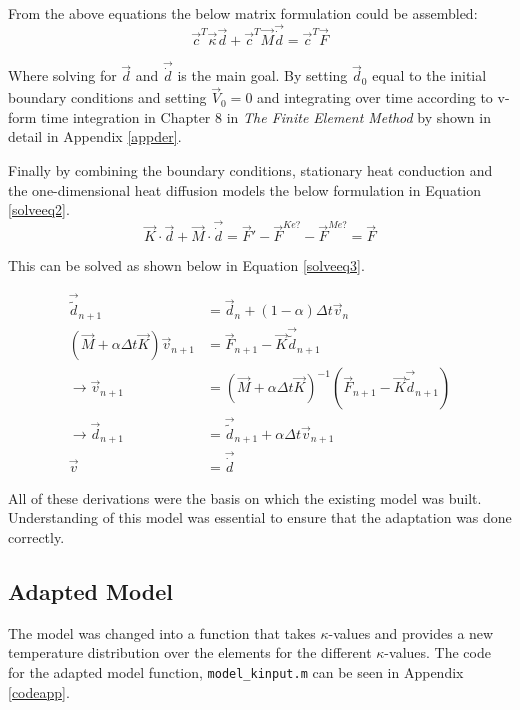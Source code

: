From the above equations the below matrix formulation could be assembled:
\begin{equation}\label{femdiffeq7}
\vec{c}^T \vec{\kappa} \vec{d} + \vec{c}^T \vec{M} \vec{\dot{d}} = \vec{c}^T \vec{F}
\end{equation}

Where solving for $\vec{d}$ and $\vec{\dot{d}}$ is the main goal.
By setting $\vec{d}_0$ equal to the initial boundary conditions and setting $\vec{V}_0 = 0$ and integrating over time according to v-form time integration in Chapter 8 in \textit{The Finite Element Method} by \citeauthor{Hughes:1987} shown in detail in Appendix \ref{appder}.


Finally by combining the boundary conditions, stationary heat conduction and the one-dimensional heat diffusion models the below formulation in Equation \ref{solveeq2}.
\begin{equation}\label{solveeq2}
\vec{K}\cdot\vec{d} + \vec{M}\cdot\vec{\dot{d}} = \vec{F}' - \vec{F}^{Ke?} - \vec{F}^{Me?} = \vec{F}
\end{equation}

This can be solved as shown below in Equation \ref{solveeq3}.

\begin{equation}\label{solveeq3}
\begin{aligned}
\vec{\tilde{d}}_{n+1} &= \vec{d}_n + (1-\alpha)\Delta t \vec{v}_n \\
(\vec{M} + \alpha\Delta t\vec{K})\vec{v}_{n+1} &= \vec{F}_{n+1} - \vec{K} \vec{\tilde{d}}_{n+1} \\
\rightarrow \vec{v}_{n+1} &= (\vec{M} + \alpha\Delta t \vec{K})^{-1} (\vec{F}_{n+1} - \vec{K} \vec{\tilde{d}}_{n+1}) \\
\rightarrow \vec{d}_{n+1} &= \vec{\tilde{d}}_{n+1} + \alpha\Delta t \vec{v}_{n+1} \\
\vec{v} &= \vec{\dot{d}}
\end{aligned}
\end{equation}

All of these derivations were the basis on which the existing model was built.
Understanding of this model was essential to ensure that the adaptation was done correctly.

	\subsection{Adapted Model} \label{adapmodsec}
		The model was changed into a function that takes $\kappa$-values and provides a new temperature distribution over the elements for the different $\kappa$-values. 
The code for the adapted model function, \texttt{model\_kinput.m} can be seen in Appendix \ref{codeapp}.
	
